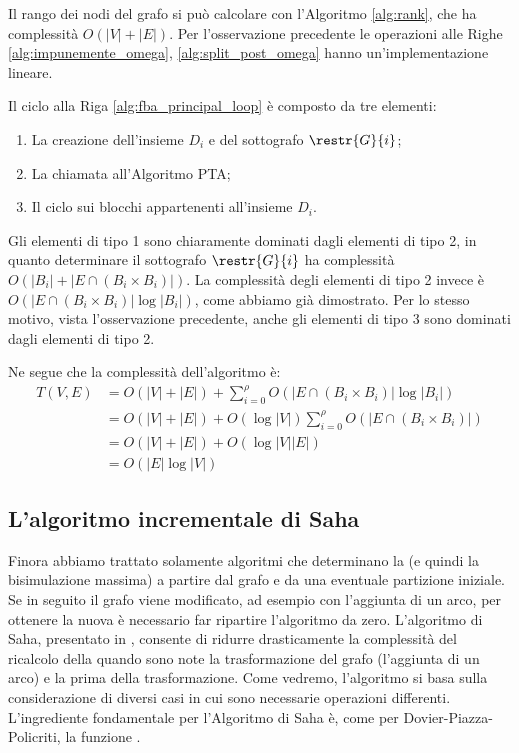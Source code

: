 \begin{proof2}
    Il rango dei nodi del grafo si può calcolare con l'Algoritmo \ref{alg:rank}, che ha complessità $O(|V|+|E|)$. Per l'osservazione precedente le operazioni alle Righe \ref{alg:impunemente_omega}, \ref{alg:split_post_omega} hanno un'implementazione lineare.

    Il ciclo alla Riga \ref{alg:fba_principal_loop} è composto da tre elementi:
    \begin{enumerate}
        \item La creazione dell'insieme $D_i$ e del sottografo $\restr{G}{i}$;
        \item La chiamata all'Algoritmo PTA;
        \item Il ciclo sui blocchi appartenenti all'insieme $D_i$.
    \end{enumerate}
    Gli elementi di tipo 1 sono chiaramente dominati dagli elementi di tipo 2, in quanto determinare il sottografo $\restr{G}{i}$ ha complessità $O(|B_i| + |E \cap (B_i \times B_i)|)$. La complessità degli elementi di tipo 2 invece è $O(|E \cap (B_i \times B_i)| \log |B_i|)$, come abbiamo già dimostrato.  Per lo stesso motivo, vista l'osservazione precedente, anche gli elementi di tipo 3 sono dominati dagli elementi di tipo 2.

    Ne segue che la complessità dell'algoritmo è:
    \begin{align*}
        T(V,E) &= O(|V| + |E|) + \sum_{i=0}^\rho O(|E \cap (B_i \times B_i)| \log |B_i|)\\
        &= O(|V| + |E|) +  O(\log |V|) \sum_{i=0}^\rho O(|E \cap (B_i \times B_i)|)\\
        &= O(|V| + |E|) +  O(\log |V| |E|)\\
        &= O(|E| \log |V|)
    \end{align*}
\end{proof2}

\newpage
\subsection{L'algoritmo incrementale di Saha}
Finora abbiamo trattato solamente algoritmi che determinano la \rscpnomath (e quindi la bisimulazione massima) a partire dal grafo e da una eventuale partizione iniziale. Se in seguito il grafo viene modificato, ad esempio con l'aggiunta di un arco, per ottenere la nuova \rscpnomath è necessario far ripartire l'algoritmo da zero. L'algoritmo di Saha, presentato in \cite{saha}, consente di ridurre drasticamente la complessità del ricalcolo della \rscpnomath quando sono note la trasformazione del grafo (l'aggiunta di un arco) e la \rscpnomath prima della trasformazione. Come vedremo, l'algoritmo si basa sulla considerazione di diversi casi in cui sono necessarie operazioni differenti. L'ingrediente fondamentale per l'Algoritmo di Saha è, come per Dovier-Piazza-Policriti, la funzione \rankfuncnomath.

